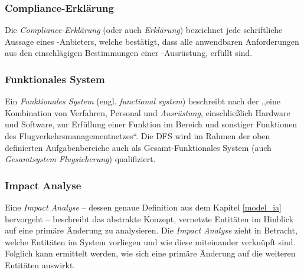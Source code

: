 \subsubsection{Compliance-Erklärung}

    Die \textit{Compliance-Erklärung} (oder auch \textit{Erklärung}) bezeichnet jede schriftliche Aussage eines \atmans-Anbieters, welche bestätigt, dass alle anwendbaren Anforderungen aus den einschlägigen Bestimmungen einer \atmans-Ausrüstung, erfüllt sind. 
    \cite[Art.2 Abs.10]{2018R1139}

\subsubsection{Funktionales System}

    Ein \textit{Funktionales System} (engl. \textit{functional system}) beschreibt nach der  ,,eine Kombination von Verfahren, Personal und \textit{Ausrüstung}, einschließlich Hardware und Software, zur Erfüllung einer Funktion im Bereich \atmans{} und sonstiger Funktionen des Flugverkehrsmanagementnetzes``\cite[Anh.I Abs.56]{2017R0373}.
    Die \ac{DFS} wird im Rahmen der oben definierten Aufgabenbereiche auch als Gesamt-Funktionales System (auch \textit{Gesamtsystem Flugsicherung}) qualifiziert.
    \cite[17]{ba_technik}

\subsubsection{Impact Analyse}

    Eine \textit{Impact Analyse} -- dessen genaue Definition aus dem Kapitel \ref{model_ia} hervorgeht -- beschreibt das abstrakte Konzept, vernetzte Entitäten im Hinblick auf eine primäre Änderung zu analysieren.
    Die \textit{Impact Analyse} zieht in Betracht, welche Entitäten im System vorliegen und wie diese miteinander verknüpft sind. 
    Folglich kann ermittelt werden, wie sich eine primäre Änderung auf die weiteren Entitäten auswirkt.